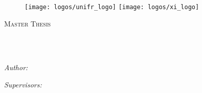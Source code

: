 

\begin{titlepage}
\begin{center}


\begin{figure}
  \centering
    \texttt{[image: logos/unifr\_logo]}
  \hfill
    \texttt{[image: logos/xi\_logo]}
  \vspace{30mm}
\end{figure}

{\scshape\LARGE \univname\par}\vspace{1.5cm} %
\textsc{\Large Master Thesis}\\[0.5cm] %
\HRule \\[0.4cm] %
{\huge \bfseries \ttitle\par}\vspace{0.4cm} %
\HRule \\[1.5cm] %

\begin{minipage}[t]{0.4\textwidth}
\begin{flushleft} \large
\emph{Author:}\\
\href{mailto://corina.masanti@students.unibe.ch}{\authorname} %
\end{flushleft}
\end{minipage}
\begin{minipage}[t]{0.4\textwidth}
\begin{flushright} \large
\emph{Supervisors:} \\
\href{https://exascale.info/members/giuseppe-cuccu/}{\supname} %
\\\vspace*{1ex}
\href{https://exascale.info/phil/}{\cosupname} %
\end{flushright}
\end{minipage}\\[1cm]


\end{center}
\end{titlepage}
